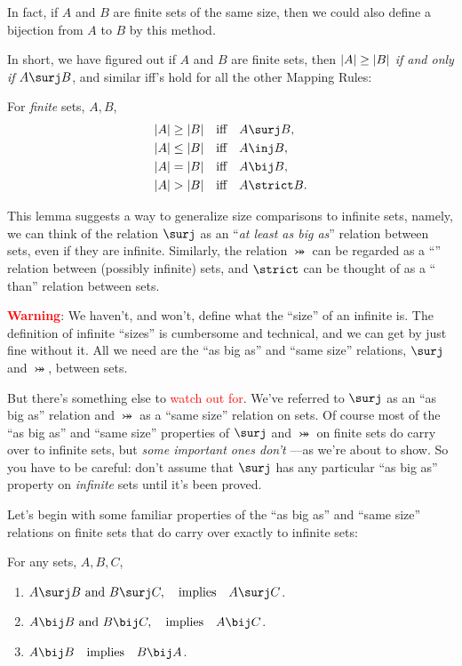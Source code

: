 In fact, if $A$ and $B$ are finite sets of the same size, then we could also
define a bijection from $A$ to $B$ by this method.

In short, we have figured out if $A$ and $B$ are finite sets, then
$\left|A\right| \geq \left|B\right|$ \emph{if and only if} $A \surj B$, and similar
iff's hold for all the other Mapping Rules:
\begin{lemma}\label{finbig}
For \emph{finite} sets, $A,B$,
\begin{align*}
\card{A} \geq \card{B} & \qiff A \surj B,\\
\card{A} \leq \card{B} & \qiff A \inj B,\\
\card{A} = \card{B} & \qiff A \bij B,\\
\card{A} > \card{B} & \qiff A \strict B.
\end{align*}
\end{lemma}

This lemma suggests a way to generalize size comparisons to infinite sets,
namely, we can think of the relation $\surj$ as an ``\emph{at least as big
  as}'' relation between sets, even if they are infinite.  Similarly, the
relation $\bij$ can be regarded as a ``'' relation between
(possibly infinite) sets, and $\strict$ can be thought of as a
`` than'' relation between sets.

\textcolor{red}{\textbf{Warning}}: We haven't, and won't, define what the
``size'' of an infinite is.  The definition of infinite ``sizes'' is
cumbersome and technical, and we can get by just fine without it.  All we
need are the ``as big as'' and ``same size'' relations, $\surj$ and
$\bij$, between sets.

But there's something else to \textcolor{red}{watch out for}.  We've
referred to $\surj$ as an ``as big as'' relation and $\bij$ as a ``same
size'' relation on sets.  Of course most of the ``as big as'' and ``same
size'' properties of $\surj$ and $\bij$ on finite sets do carry over to
infinite sets, but \emph{some important ones don't} ---as we're about to
show.  So you have to be careful: don't assume that $\surj$ has any
particular ``as big as'' property on \emph{infinite} sets until it's been
proved.

Let's begin with some familiar properties of the ``as big as'' and ``same
size'' relations on finite sets that do carry over exactly to infinite
sets:
\begin{lemma}\label{translem}
For any sets, $A,B,C$,
\begin{enumerate}

\item \label{bigtrans}
$A \surj  B \text{ and } B \surj C, \qimplies  A \surj C$.

\item \label{sametrans} $A \bij B \text{ and } B \bij C, \qimplies A \bij C$.

\item\label{sameABA}
$A \bij B \qimplies B \bij A$.
\end{enumerate}
\end{lemma}

